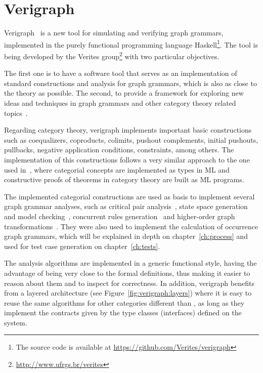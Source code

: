 \chapter{Verigraph}\label{ch:verigraph}

Verigraph~\cite{verigraph} is a new tool for simulating and verifying graph grammars, implemented in the purely functional programming language Haskell\footnote{The source code is available at \url{https://github.com/Verites/verigraph}}. The tool is being developed by the Verites group\footnote{\url{http://www.ufrgs.br/verites}} with two particular objectives. 

  The first one is to have a software tool that serves as an implementation of standard constructions and analysis for graph grammars, which is also as close to the theory as possible. The second, to provide a framework for exploring new ideas and techniques in graph grammars and other category theory related topics~\cite{BezerraETMF2016,Costa2016,CostaETMF2016, Becker2014}.

Regarding category theory, verigraph implements important basic constructions such as coequalizers, coproducts, colimits, pushout complements, initial pushouts, pullbacks, negative application conditions, constraints, among others. The implementation of this constructions follows a very similar approach to the one used in~\cite{Rydeheard1988}, where categorial concepts are implemented as types in ML and constructive proofs of theorems in category theory are built as ML programs.

The implemented categorial constructions are used as basis to implement several graph grammar analyses, such as critical pair analysis~\cite{Lambers2006}, state space generation and model checking~\cite{Becker2014}, concurrent rules generation~\cite{BezerraETMF2016} and higher-order graph transformations~\cite{Machado2015}. They were also used to implement the calculation of occurrence graph grammars, which will be explained in depth on
chapter~\ref{ch:process} and used for test case generation on chapter~\ref{ch:tests}.

The analysis algorithms are implemented in a generic functional style, having the advantage of being very close to the formal definitions, thus making it easier to reason about them and to inspect for correctness. In addition, verigraph benefits from a layered architecture (see Figure~\ref{fig:verigraph:layers})  where it is easy to reuse the same algorithms for other categories different than , as long as they implement the contracts given by the type
classes (interfaces) defined on the system. 

